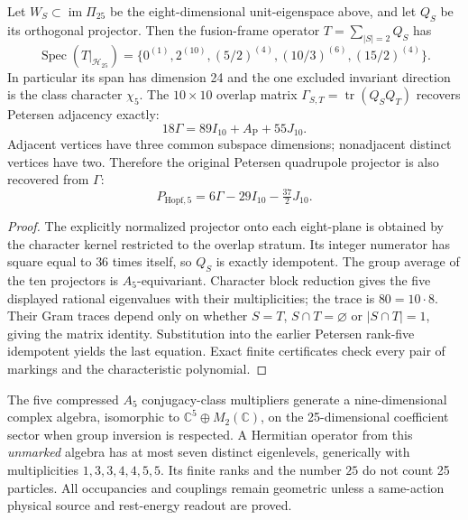 \documentclass[12pt,a4paper]{article}
\begin{document}
\begin{theorem}
\label{p6:thm:v338-eight-plane-fusion}
Let $W_S\subset\operatorname{im}\Pi_{25}$ be the eight-dimensional
unit-eigenspace above, and let $Q_S$ be its orthogonal projector.
Then the fusion-frame operator $T=\sum_{|S|=2}Q_S$ has
\[
 \operatorname{Spec}(T|_{\mathcal H_{25}})
 =\{0^{(1)},2^{(10)},(5/2)^{(4)},(10/3)^{(6)},(15/2)^{(4)}\}.
\]
In particular its span has dimension 24 and the one excluded
invariant direction is the class character $\chi_5$.  The
$10\times10$ overlap matrix $\Gamma_{S,T}=\operatorname{tr}(Q_SQ_T)$
recovers Petersen adjacency exactly:
\[
 18\Gamma=89I_{10}+A_{\mathrm P}+55J_{10}.
\]
Adjacent vertices have three common subspace dimensions;
nonadjacent distinct vertices have two.  Therefore the original
Petersen quadrupole projector is also recovered from $\Gamma$:
\[
 P_{\mathrm{Hopf},5}=6\Gamma-29I_{10}-\tfrac{37}{2}J_{10}.
\]
\end{theorem}
\begin{proof}
The explicitly normalized projector onto each eight-plane is
obtained by the character kernel restricted to the overlap stratum.
Its integer numerator has square equal to $36$ times itself,
so $Q_S$ is exactly idempotent.  The group average of the ten
projectors is $A_5$-equivariant.  Character block reduction gives
the five displayed rational eigenvalues with their multiplicities;
the trace is $80=10\cdot8$.  Their Gram traces depend only on whether
$S=T$, $S\cap T=\varnothing$ or $|S\cap T|=1$, giving the
matrix identity.  Substitution into the earlier Petersen rank-five
idempotent yields the last equation.  Exact finite certificates
check every pair of markings and the characteristic polynomial.
\end{proof}

\begin{remark}
The five compressed $A_5$ conjugacy-class multipliers generate a
nine-dimensional complex algebra, isomorphic to
$\mathbb C^5\oplus M_2(\mathbb C)$, on the 25-dimensional
coefficient sector when group inversion is respected.  A Hermitian
operator from this \emph{unmarked} algebra has at most seven distinct
eigenlevels, generically with multiplicities $1,3,3,4,4,5,5$.
Its finite ranks and the number $25$ do not count 25 particles.
All occupancies and couplings remain geometric unless a same-action
physical source and rest-energy readout are proved.
\end{remark}
\end{document}
